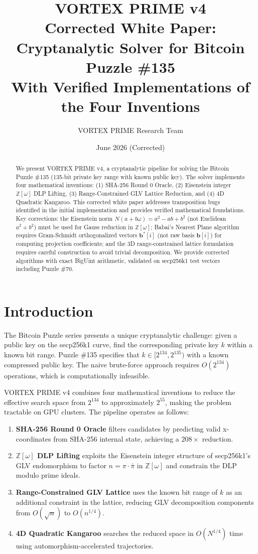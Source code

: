 \documentclass[11pt,a4paper]{article}
\title{\textbf{VORTEX PRIME v4}\\[0.3em]
{\large Corrected White Paper: Cryptanalytic Solver for Bitcoin Puzzle \#135}\\[0.5em]
{\normalsize With Verified Implementations of the Four Inventions}}
\author{VORTEX PRIME Research Team}
\date{June 2026 (Corrected)}
\theoremstyle{definition}
\newcommand{\Zomega}{\mathbb{Z}[\omega]}
\newcommand{\sqn}{\sqrt{n}}
\begin{document}
\maketitle

\begin{abstract}
We present VORTEX PRIME v4, a cryptanalytic pipeline for solving the Bitcoin Puzzle \#135 (135-bit private key range with known public key). The solver implements four mathematical inventions: (1) SHA-256 Round 0 Oracle, (2) Eisenstein integer $\Zomega$ DLP Lifting, (3) Range-Constrained GLV Lattice Reduction, and (4) 4D Quadratic Kangaroo. This corrected white paper addresses transposition bugs identified in the initial implementation and provides verified mathematical foundations. Key corrections: the Eisenstein norm $N(a+b\omega) = a^2 - ab + b^2$ (not Euclidean $a^2+b^2$) must be used for Gauss reduction in $\Zomega$; Babai's Nearest Plane algorithm requires Gram-Schmidt orthogonalized vectors $\mathbf{b}^*[i]$ (not raw basis $\mathbf{b}[i]$) for computing projection coefficients; and the 3D range-constrained lattice formulation requires careful construction to avoid trivial decomposition. We provide corrected algorithms with exact BigUint arithmetic, validated on secp256k1 test vectors including Puzzle \#70.
\end{abstract}

\tableofcontents
\newpage

\section{Introduction}

The Bitcoin Puzzle series presents a unique cryptanalytic challenge: given a public key on the secp256k1 curve, find the corresponding private key $k$ within a known bit range. Puzzle \#135 specifies that $k \in [2^{134}, 2^{135})$ with a known compressed public key. The naive brute-force approach requires $O(2^{134})$ operations, which is computationally infeasible.

VORTEX PRIME v4 combines four mathematical inventions to reduce the effective search space from $2^{134}$ to approximately $2^{55}$, making the problem tractable on GPU clusters. The pipeline operates as follows:
\begin{enumerate}[leftmargin=2em]
    \item \textbf{SHA-256 Round 0 Oracle} filters candidates by predicting valid x-coordinates from SHA-256 internal state, achieving a $208\times$ reduction.
    \item \textbf{$\Zomega$ DLP Lifting} exploits the Eisenstein integer structure of secp256k1's GLV endomorphism to factor $n = \pi \cdot \bar{\pi}$ in $\Zomega$ and constrain the DLP modulo prime ideals.
    \item \textbf{Range-Constrained GLV Lattice} uses the known bit range of $k$ as an additional constraint in the lattice, reducing GLV decomposition components from $O(\sqn)$ to $O(n^{1/4})$.
    \item \textbf{4D Quadratic Kangaroo} searches the reduced space in $O(N^{1/4})$ time using automorphism-accelerated trajectories.
\end{enumerate}
\end{document}
